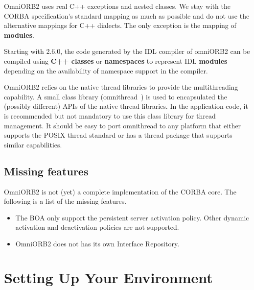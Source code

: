 \documentclass[11pt,twoside,onecolumn]{book}
\begin{document}
OmniORB2 uses real C++ exceptions and nested classes. We stay with the
CORBA specification's standard mapping as much as possible and do not use
the alternative mappings for C++ dialects. The only exception is the
mapping of {\bf modules}.

Starting with 2.6.0, the code generated by the IDL compiler of omniORB2 can
be compiled using {\bf C++ classes} or {\bf namespaces} to represent IDL
{\bf modules} depending on the availability of namespace support in the
compiler.

OmniORB2 relies on the native thread libraries to provide the
multithreading capability. A small class library (omnithread~\cite{tjr96a})
is used to encapsulated the (possibly different) APIs of the native thread
libraries. In the application code, it is recommended but not mandatory to
use this class library for thread management. It should be easy to port
omnithread to any platform that either supports the POSIX thread standard
or has a thread package that supports similar capabilities.

\subsection{Missing features}

OmniORB2 is not (yet) a complete implementation of the CORBA core. 
The following is a list of the missing features. 

\begin{itemize}

\item The BOA only support the persistent server activation policy. Other
dynamic activation and deactivation policies are not supported.
\item OmniORB2 does not has its own Interface Repository.
\end{itemize}



\section{Setting Up Your Environment}
\label{setup}

\end{document}
